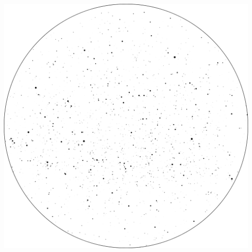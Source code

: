 \documentclass{SAS-class-skygen}
\begin{document}
	\vspace{0.5cm}
    \begin{center}
    \includegraphics[width=\textwidth]{./pics/sky_chart20.png}
    \end{center}
    
    
\end{document}
